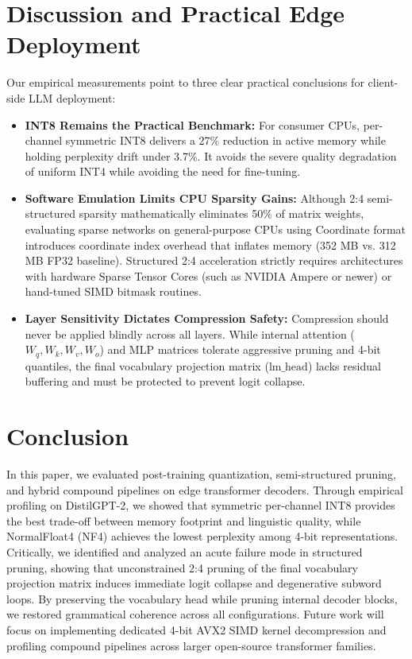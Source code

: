 \documentclass[conference]{IEEEtran}
\begin{document}
\section{Discussion and Practical Edge Deployment}
Our empirical measurements point to three clear practical conclusions for client-side LLM deployment:
\begin{itemize}
    \item \textbf{INT8 Remains the Practical Benchmark:} For consumer CPUs, per-channel symmetric INT8 delivers a 27\% reduction in active memory while holding perplexity drift under 3.7\%. It avoids the severe quality degradation of uniform INT4 while avoiding the need for fine-tuning.
    \item \textbf{Software Emulation Limits CPU Sparsity Gains:} Although 2:4 semi-structured sparsity mathematically eliminates 50\% of matrix weights, evaluating sparse networks on general-purpose CPUs using Coordinate format introduces coordinate index overhead that inflates memory (352 MB vs. 312 MB FP32 baseline). Structured 2:4 acceleration strictly requires architectures with hardware Sparse Tensor Cores (such as NVIDIA Ampere or newer) or hand-tuned SIMD bitmask routines.
    \item \textbf{Layer Sensitivity Dictates Compression Safety:} Compression should never be applied blindly across all layers. While internal attention ($W_q, W_k, W_v, W_o$) and MLP matrices tolerate aggressive pruning and 4-bit quantiles, the final vocabulary projection matrix ($\text{lm\_head}$) lacks residual buffering and must be protected to prevent logit collapse.
\end{itemize}

\section{Conclusion}
In this paper, we evaluated post-training quantization, semi-structured pruning, and hybrid compound pipelines on edge transformer decoders. Through empirical profiling on DistilGPT-2, we showed that symmetric per-channel INT8 provides the best trade-off between memory footprint and linguistic quality, while NormalFloat4 (NF4) achieves the lowest perplexity among 4-bit representations. Critically, we identified and analyzed an acute failure mode in structured pruning, showing that unconstrained 2:4 pruning of the final vocabulary projection matrix induces immediate logit collapse and degenerative subword loops. By preserving the vocabulary head while pruning internal decoder blocks, we restored grammatical coherence across all configurations. Future work will focus on implementing dedicated 4-bit AVX2 SIMD kernel decompression and profiling compound pipelines across larger open-source transformer families.
\end{document}
